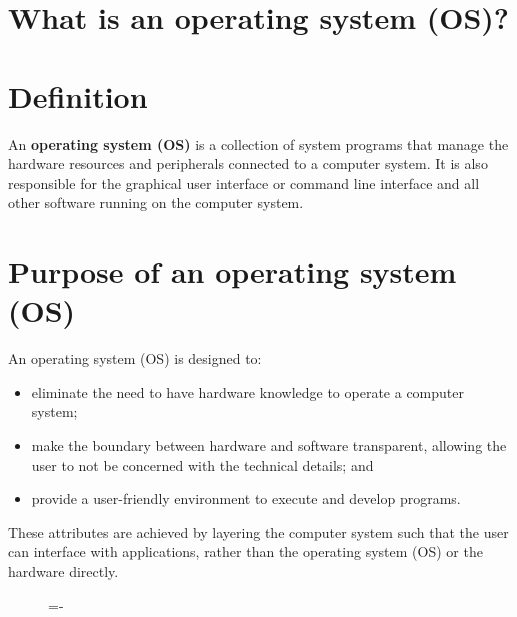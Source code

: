 \documentclass[a4paper]{systems-software}
\begin{document}
\section{What is an operating system (OS)?}

\section*{Definition}

An \textbf{operating system (OS)} is a collection of system programs that manage the hardware resources and peripherals connected to a computer system. It is also responsible for the graphical user interface or command line interface and all other software running on the computer system.


\section*{Purpose of an operating system (OS)}

An operating system (OS) is designed to:
\begin{itemize}
	\item eliminate the need to have hardware knowledge to operate a computer system;
	\item make the boundary between hardware and software transparent, allowing the user to not be concerned with the technical details; and
	\item provide a user-friendly environment to execute and develop programs.
\end{itemize}

These attributes are achieved by layering the computer system such that the user can interface with applications, rather than the operating system (OS) or the hardware directly.

\begin{figure}[H]
  \lineskip=-\fboxrule
\end{figure}
\end{document}
